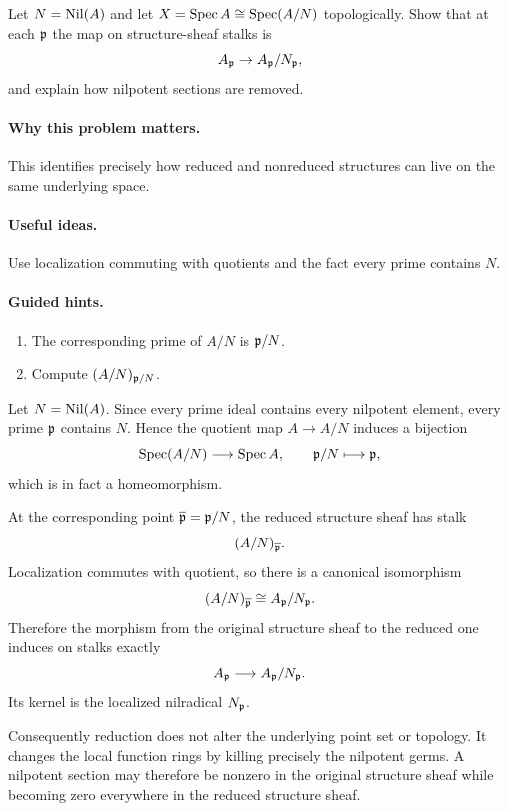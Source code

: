 \begin{problem}\label{prob:vi17-p16}
Let $N=\operatorname{Nil}(A)$ and let $X=\operatorname{Spec} A\cong\operatorname{Spec}(A/N)$ topologically.  Show that at each $\mathfrak p$ the map on structure-sheaf stalks is
\[A_{\mathfrak p}\to A_{\mathfrak p}/N_{\mathfrak p},\]
and explain how nilpotent sections are removed.
\end{problem}

\ifdefined\FullProblemDossiers
\paragraph{Why this problem matters.}
This identifies precisely how reduced and nonreduced structures can live on the same underlying space.

\paragraph{Useful ideas.}
Use localization commuting with quotients and the fact every prime contains $N$.

\paragraph{Guided hints.}
\begin{enumerate}
\item The corresponding prime of $A/N$ is $\mathfrak p/N$.
\item Compute $(A/N)_{\mathfrak p/N}$.
\end{enumerate}

\begin{solution}
Let $N=\operatorname{Nil}(A)$.  Since every prime ideal contains every nilpotent element, every prime $\mathfrak p$ contains $N$.  Hence the quotient map $A\to A/N$ induces a bijection
\[
\operatorname{Spec}(A/N)\longrightarrow\operatorname{Spec} A,
\qquad
\mathfrak p/N\longmapsto\mathfrak p,
\]
which is in fact a homeomorphism.

At the corresponding point $\overline{\mathfrak p}=\mathfrak p/N$, the reduced structure sheaf has stalk
\[
(A/N)_{\overline{\mathfrak p}}.
\]
Localization commutes with quotient, so there is a canonical isomorphism
\[
(A/N)_{\overline{\mathfrak p}}\cong A_{\mathfrak p}/N_{\mathfrak p}.
\]
Therefore the morphism from the original structure sheaf to the reduced one induces on stalks exactly
\[
A_{\mathfrak p}\longrightarrow A_{\mathfrak p}/N_{\mathfrak p}.
\]
Its kernel is the localized nilradical $N_{\mathfrak p}$.

Consequently reduction does not alter the underlying point set or topology.  It changes the local function rings by killing precisely the nilpotent germs.  A nilpotent section may therefore be nonzero in the original structure sheaf while becoming zero everywhere in the reduced structure sheaf.
\end{solution}



